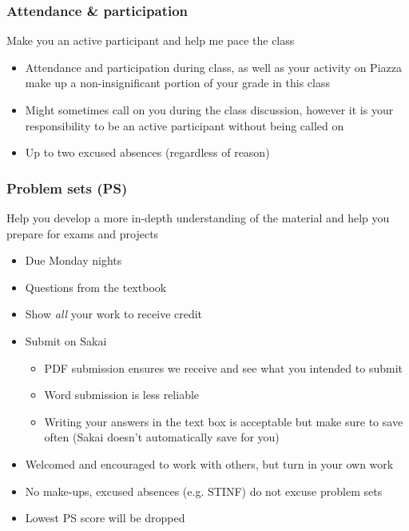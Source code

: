 \documentclass[slidestop,compress,mathserif,12pt,t,professionalfonts,xcolor=table]{beamer}
\begin{document}

\begin{frame}
\frametitle{Attendance \& participation}

 Make you an active participant and help me pace the class 

\begin{itemize}

\item Attendance and participation during class, as well as your activity on Piazza make up a non-insignificant portion of your grade in this class

\item Might sometimes call on you during the class discussion, however it is your responsibility to be an active participant without being called on

\item Up to two excused absences (regardless of reason)

\end{itemize}

\end{frame}


\begin{frame}
\frametitle{Problem sets (PS)}

 Help you develop a more in-depth understanding of the material and help you prepare for exams and projects

\begin{itemize}

\item Due Monday nights

\item Questions from the textbook

\item Show \emph{all} your work to receive credit

\item Submit on Sakai
\begin{itemize}
\item PDF submission ensures we receive and see what you intended to submit
\item Word submission is less reliable
\item Writing your answers in the text box is acceptable but make sure to save often (Sakai doesn't automatically save for you)
\end{itemize}

\item Welcomed and encouraged to work with others, but turn in your own work

\item No make-ups, excused absences (e.g. STINF) do not excuse problem sets

\item Lowest PS score will be dropped

\end{itemize}

\end{frame}
\end{document}
